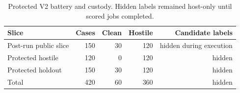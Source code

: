 \begin{table}[t]
\centering\scriptsize
\caption{Protected V2 battery and custody. Hidden labels remained host-only until scored jobs completed.}\label{tab:p4_t1}
\begin{tabular}{lrrrr}\toprule
Slice & Cases & Clean & Hostile & Candidate labels \\\midrule
Post-run public slice & 150 & 30 & 120 & hidden during execution \\
Protected hostile & 120 & 0 & 120 & hidden \\
Protected holdout & 150 & 30 & 120 & hidden \\\midrule
Total & 420 & 60 & 360 & hidden \\\bottomrule
\end{tabular}\end{table}
